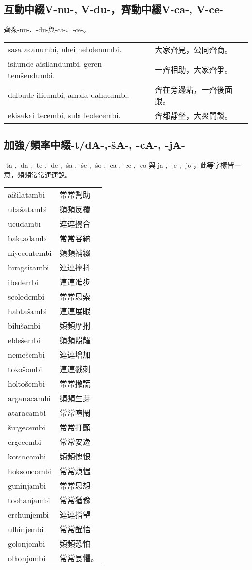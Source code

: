 \documentclass{article}
\begin{document}
\subsection{互動中綴V-nu-, V-du-，齊動中綴V-ca-, V-ce-}
\noindent 齊衆-nu-、-du-與-ca-、-ce-。
\begin{center}
    \begin{tabularx}{\textwidth}{XX}
     sasa acanumbi, uhei hebdenumbi.&大家齊見，公同齊商。\\
     ishunde aisilandumbi, geren tem\v{s}endumbi.&一齊相助，大家齊爭。\\
     dalbade ilicambi, amala dahacambi.&齊在旁邊站，一齊後面跟。\\
     ekisakai tecembi, sula leolecembi.&齊都靜坐，大衆閒談。
    \end{tabularx}
\end{center}

\subsection{加強/頻率中綴-t/dA-,-\v{s}A-, -cA-, -jA-}
\noindent -ta-, -da-, -te-, -de-, -\v{s}a-, -\v{s}e-, -\v{s}o-, -ca-, -ce-, -co-與-ja-, -je-, -jo-，此等字樣皆一意，頻頻常常連連說。
\begin{center}
    \begin{tabularx}{\textwidth}{XX}
     ai\v{s}ilatambi &常常幫助\\uba\v{s}atambi&頻頻反覆\\ucudambi &連連攪合\\baktadambi &常常容納\\niyecentembi&頻頻補綴\\h\={u}ngsitambi&連連摔抖\\ibedembi&連連進步\\seoledembi &常常思索\\habta\v{s}ambi&連連展眼\\bilu\v{s}ambi &頻頻摩拊\\elde\v{s}embi&頻頻照耀\\neme\v{s}embi&連連增加\\toko\v{s}ombi &連連戮刺\\holto\v{s}ombi&常常撒謊\\arganacambi&頻頻生芽\\ataracambi&常常喧鬧\\\v{s}urgecembi&常常打顫\\ergecembi&常常安逸\\korsocombi&頻頻愧恨\\hoksoncombi&常常煩愠\\g\={u}ninjambi&常常思想\\toohanjambi&常常猶豫\\erehunjembi& 連連指望\\ulhinjembi&常常醒悟\\golonjombi&頻頻恐怕\\olhonjombi&常常畏懼。
    \end{tabularx}
\end{center}
\end{document}
